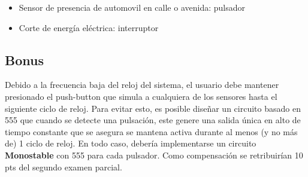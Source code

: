 \begin{itemize}
    \item Sensor de presencia de automovil en calle o avenida: pulsador
    \item Corte de energía eléctrica: interruptor 
\end{itemize}  

\subsection{Bonus}
Debido a la frecuencia baja del reloj del sistema, el usuario debe mantener presionado el push-button que simula a cualquiera de los sensores hasta el siguiente ciclo de reloj.
Para evitar esto, es posible diseñar un circuito basado en 555 que cuando se detecte una pulsación, este genere una salida única en alto de tiempo constante que se asegura se
mantena activa durante al menos (y no más de) 1 ciclo de reloj. En todo caso, debería implementarse un circuito \textbf{Monostable} con 555 para cada pulsador. Como compensación
se retribuirían 10 pts del segundo examen parcial.